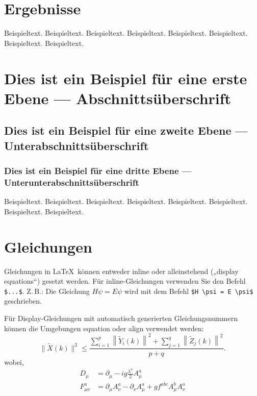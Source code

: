 \documentclass[pdflatex,sn-mathphys-num]{sn-jnl}%
\theoremstyle{thmstyleone}%
\theoremstyle{thmstyletwo}%
\theoremstyle{thmstylethree}%
\begin{document}
\section{Ergebnisse}\label{sec2}

Beispieltext. Beispieltext. Beispieltext. Beispieltext. Beispieltext. Beispieltext. Beispieltext. Beispieltext.

\section{Dies ist ein Beispiel für eine erste Ebene --- Abschnittsüberschrift}\label{sec3}

\subsection{Dies ist ein Beispiel für eine zweite Ebene --- Unterabschnittsüberschrift}\label{subsec2}

\subsubsection{Dies ist ein Beispiel für eine dritte Ebene --- Unterunterabschnittsüberschrift}\label{subsubsec2}

Beispieltext. Beispieltext. Beispieltext. Beispieltext. Beispieltext. Beispieltext. Beispieltext. Beispieltext. 

\section{Gleichungen}\label{sec4}

Gleichungen in \LaTeX\ können entweder inline oder alleinstehend („display equations“) gesetzt werden. Für inline-Gleichungen verwenden Sie den Befehl \verb+$...$+. Z.\,B.: Die Gleichung
$H\psi = E \psi$ wird mit dem Befehl \verb+$H \psi = E \psi$+ geschrieben.

Für Display-Gleichungen mit automatisch generierten Gleichungsnummern können die Umgebungen equation oder align verwendet werden:
\begin{equation}
\|\tilde{X}(k)\|^2 \leq\frac{\sum\limits_{i=1}^{p}\left\|\tilde{Y}_i(k)\right\|^2+\sum\limits_{j=1}^{q}\left\|\tilde{Z}_j(k)\right\|^2 }{p+q}.\label{eq1}
\end{equation}
wobei,
\begin{align}
D_\mu &=  \partial_\mu - ig \frac{\lambda^a}{2} A^a_\mu \nonumber \\
F^a_{\mu\nu} &= \partial_\mu A^a_\nu - \partial_\nu A^a_\mu + g f^{abc} A^b_\mu A^a_\nu \label{eq2}
\end{align}
\end{document}
